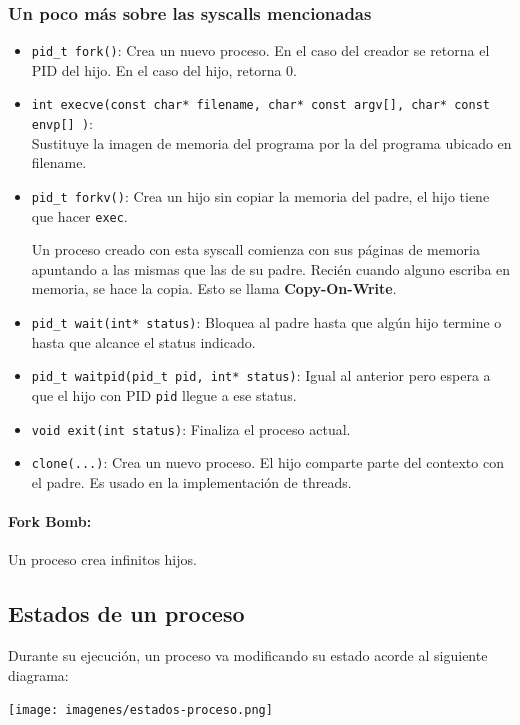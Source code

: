 \subsubsection{Un poco más sobre las syscalls mencionadas}
\begin{itemize}
    \item \texttt{pid\_t fork()}: Crea un nuevo proceso. En el caso del creador se retorna el PID del hijo. En el caso del hijo, retorna 0.
    \item \texttt{int\ execve(const char* filename, char* const argv[], char* const envp[] )}: \\ Sustituye la imagen de memoria del programa por la del programa ubicado en filename.
    \item \texttt{pid\_t forkv()}: Crea un hijo sin copiar la memoria del padre, el hijo tiene que hacer \texttt{exec}.

    Un proceso creado con esta syscall comienza con sus páginas de memoria apuntando a las mismas que las de su padre. Recién cuando alguno escriba en memoria, se hace la copia. Esto se llama \textbf{Copy-On-Write}.

    \item \texttt{pid\_t wait(int* status)}: Bloquea al padre hasta que algún hijo termine o hasta que alcance el status indicado.
    \item \texttt{pid\_t waitpid(pid\_t pid, int* status)}: Igual al anterior pero espera a que el hijo con PID \texttt{pid} llegue a ese status.
    \item \texttt{void exit(int status)}: Finaliza el proceso actual.
    \item \texttt{clone(...)}: Crea un nuevo proceso. El hijo comparte parte del contexto con el padre. Es usado en la implementación de threads.
\end{itemize}

\paragraph{Fork Bomb:} Un proceso crea infinitos hijos.
\subsection{Estados de un proceso}\label{procesos::estados}
Durante su ejecución, un proceso va modificando su estado acorde al siguiente diagrama:

\begin{center}
    \vspace*{0.5cm}
    \texttt{[image: imagenes/estados-proceso.png]}
\end{center}

